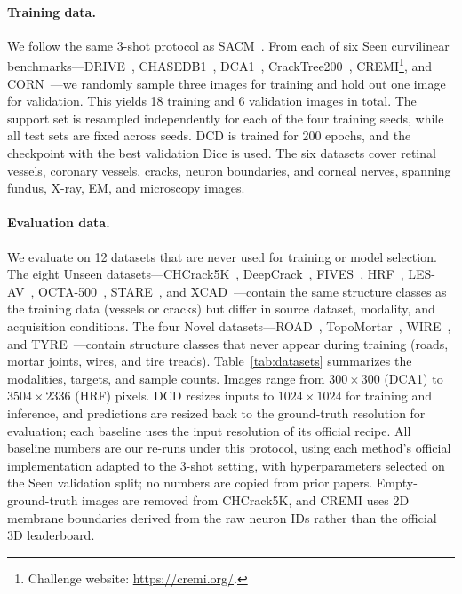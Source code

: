 \paragraph{Training data.}
We follow the same 3-shot protocol as SACM~\cite{zhu2026sacm}.  From each of
six Seen curvilinear benchmarks---DRIVE~\cite{staal2004drive},
CHASEDB1~\cite{owen2009chasedb1}, DCA1~\cite{cervantes2019dca1},
CrackTree200~\cite{zou2012cracktree}, CREMI\footnote{Challenge website: \url{https://cremi.org/}.}, and
CORN~\cite{mou2019csnet}---we randomly sample three images for training and
hold out one image for validation.  This yields 18 training and 6 validation
images in total.  The support set is resampled independently for each of the
four training seeds, while all test sets are fixed across seeds.  DCD is
trained for 200 epochs, and the checkpoint with the best validation Dice is
used.  The six
datasets cover retinal vessels, coronary vessels, cracks, neuron boundaries,
and corneal nerves, spanning fundus, X-ray, EM, and microscopy images.

\paragraph{Evaluation data.}
We evaluate on 12 datasets that are never used for training or model
selection.  The eight Unseen datasets---CHCrack5K~\cite{chen2025hacnetv2},
DeepCrack~\cite{liu2019deepcrack}, FIVES~\cite{jin2022fives},
HRF~\cite{budai2013robust}, LES-AV~\cite{orlando2018glaucoma},
OCTA-500~\cite{li2024octa500}, STARE~\cite{hoover2000stare}, and
XCAD~\cite{ma2021ssvs}---contain the same structure classes as the training
data (vessels or cracks) but differ in source dataset, modality, and
acquisition conditions.  The four Novel
datasets---ROAD~\cite{mnih2013machine},
TopoMortar~\cite{valverde2025topomortar}, WIRE~\cite{zhu2026sacm},
and TYRE~\cite{zhu2026sacm}---contain structure classes that never appear during
training (roads, mortar joints, wires, and tire treads).
Table~\ref{tab:datasets} summarizes the modalities, targets, and sample
counts.  Images range from $300\times300$ (DCA1) to $3504\times2336$ (HRF)
pixels.  DCD resizes inputs to $1024\times1024$ for training and inference,
and predictions are resized back to the ground-truth resolution for
evaluation; each baseline uses the input resolution of its official recipe.
All baseline numbers are our re-runs under this protocol, using each method's
official implementation adapted to the 3-shot setting, with hyperparameters
selected on the Seen validation split; no numbers are copied from prior
papers.  Empty-ground-truth images are removed from CHCrack5K, and
CREMI uses 2D membrane boundaries derived from the raw neuron IDs rather
than the official 3D leaderboard.

